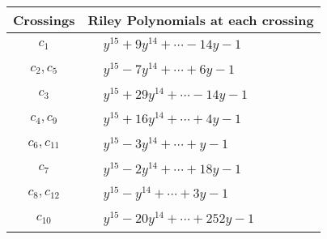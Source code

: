 \documentclass[1p]{elsarticle_modified}
\theoremstyle{definition}
\begin{document}
\begin{tabular}{m{50pt}|m{274pt}}
Crossings & \hspace{64pt}Riley Polynomials at each crossing \\
\hline $$\begin{aligned}c_{1}\end{aligned}$$&$\begin{aligned}
&y^{15}+9 y^{14}+\cdots-14 y-1
\end{aligned}$\\
\hline $$\begin{aligned}c_{2},c_{5}\end{aligned}$$&$\begin{aligned}
&y^{15}-7 y^{14}+\cdots+6 y-1
\end{aligned}$\\
\hline $$\begin{aligned}c_{3}\end{aligned}$$&$\begin{aligned}
&y^{15}+29 y^{14}+\cdots-14 y-1
\end{aligned}$\\
\hline $$\begin{aligned}c_{4},c_{9}\end{aligned}$$&$\begin{aligned}
&y^{15}+16 y^{14}+\cdots+4 y-1
\end{aligned}$\\
\hline $$\begin{aligned}c_{6},c_{11}\end{aligned}$$&$\begin{aligned}
&y^{15}-3 y^{14}+\cdots+y-1
\end{aligned}$\\
\hline $$\begin{aligned}c_{7}\end{aligned}$$&$\begin{aligned}
&y^{15}-2 y^{14}+\cdots+18 y-1
\end{aligned}$\\
\hline $$\begin{aligned}c_{8},c_{12}\end{aligned}$$&$\begin{aligned}
&y^{15}- y^{14}+\cdots+3 y-1
\end{aligned}$\\
\hline $$\begin{aligned}c_{10}\end{aligned}$$&$\begin{aligned}
&y^{15}-20 y^{14}+\cdots+252 y-1
\end{aligned}$\\
\hline
\end{tabular}\\~\\
\end{document}
